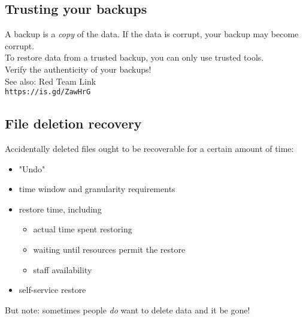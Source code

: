 \documentclass[xga]{xdvislides}
\begin{document}
\subsection{Trusting your backups}

A backup is a {\em copy} of the data.  If the data is
corrupt, your backup may become corrupt. \\

To restore data from a trusted backup, you can only
use trusted tools. \\

Verify the authenticity of your backups! \\

See also: Red Team Link \\
\verb+https://is.gd/ZawHrG+

\subsection{File deletion recovery}
Accidentally deleted files ought to be recoverable for
a certain amount of time:
\begin{itemize}
	\item "Undo"
	\item time window and granularity requirements
	\item restore time, including
		\begin{itemize}
			\item actual time spent restoring
			\item waiting until resources permit the restore
			\item staff availability
		\end{itemize}
	\item self-service restore
\end{itemize}
\vspace{.5in}
But note: sometimes people {\em do} want to delete
data and it be gone!

 
\end{document}
